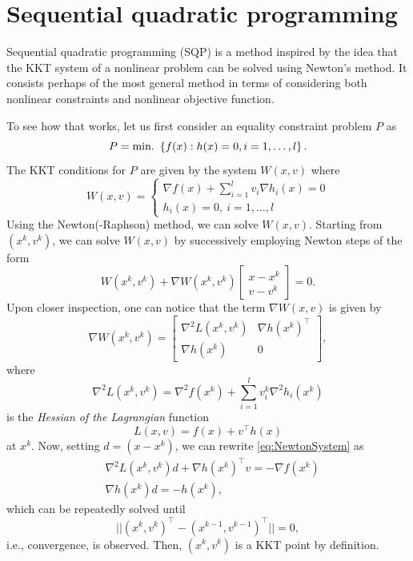 

\section{Sequential quadratic programming}


Sequential quadratic programming (SQP) is a method inspired by the idea that the KKT system of a nonlinear problem can be solved using Newton's method. It consists perhaps of the most general method in terms of considering both nonlinear constraints and nonlinear objective function. 

To see how that works, let us first consider an equality constraint problem $P$ as
$$
P = \mathop{\text{min.~}}\left\{ f(x) : h(x) = 0, i = 1,\dots,l \right \}.$$ 
The KKT conditions for $P$ are given by the system $W(x,v)$ where
$$
W(x,v) = \begin{cases} \nabla f(x) + \sum_{i=1}^{l}v_i\nabla h_i(x) = 0\\
                       h_i(x) = 0, \ i = 1, \dots, l  
         \end{cases}
$$
Using the Newton(-Raphson) method, we can solve $W(x,v)$. Starting from $(x^k, v^k)$, we can solve $W(x,v)$ by successively employing Newton steps of the form
%
\begin{equation} \label{eq:NewtonSystem}
W(x^k, v^k) + \nabla W(x^k, v^k)\begin{bmatrix} x - x^k\\
                                                v - v^k 
                                \end{bmatrix} = 0.
\end{equation}
%
Upon closer inspection, one can notice that the term $\nabla W(x,v)$ is given by
$$ \nabla W(x^k, v^k) = \begin{bmatrix} \nabla^2L(x^k,v^k) & \nabla h(x^k)^\top\\
                                        \nabla h(x^k)        & 0
                        \end{bmatrix},
$$
where 
$$
\nabla^2L(x^k,v^k) = \nabla^2f(x^k) + \sum_{i=1}^lv^k_i\nabla^2h_i(x^k)
$$ 
is the \emph{Hessian of the Lagrangian} function 
$$
L(x,v) = f(x) + v^\top h(x) 
$$
at $x^k$. Now, setting $d = (x - x^k)$, we can rewrite \eqref{eq:NewtonSystem} as
%
\begin{align}
& \nabla^2L(x^k,v^k)d + \nabla h(x^k)^\top v = -\nabla f(x^k) \label{QP_opt_cond1}\\
& \nabla h(x^k)d = -h(x^k), \label{QP_opt_cond2}
\end{align}
which can be repeatedly solved until 
$$
||(x^{k},v^k)^\top - (x^{k-1}, v^{k-1})^\top|| = 0,
$$
i.e., convergence, is observed. Then, $(x^{k},v^{k})$ is a KKT point by definition.


